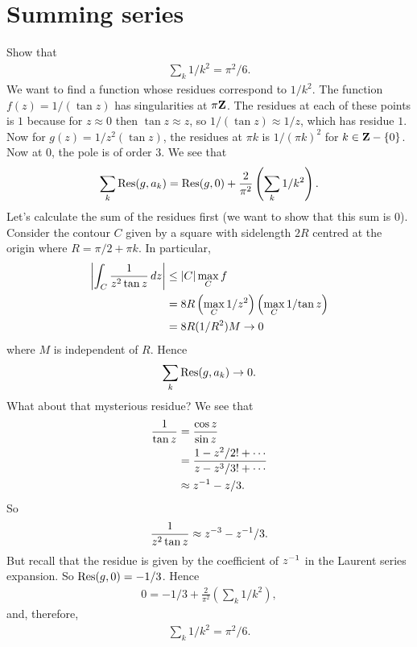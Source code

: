 \documentclass[11pt, oneside,margin=1in]{article}
\begin{document}
\section{Summing series}
\begin{example}\label{}\text{}
Show that
\begin{align*}
	\sum_k 1/k^2 = \pi^2/6.
\end{align*}
We want to find a function whose residues correspond to $1/k^2$. The function $f(z) = 1/ (\tan z)$ has singularities at $\pi \mathbf Z$. The residues at each of these points is $1$ because for $z\approx 0$ then $\tan z \approx z$, so $1/(\tan z)\approx 1/z$, which has residue $1$. Now for $g(z) = 1/z^2 (\tan z)$, the residues at $\pi k$ is $1/(\pi k)^2$ for $k \in \mathbf Z- \{0\}$. Now at $0$, the pole is of order $3$. We see that
\begin{align*}
	\sum_k \operatorname{Res}(g,a_k) = \operatorname{Res}(g,0) + \frac{2}{\pi^2} \left( \sum_k 1/k^2 \right).
\end{align*}
Let's calculate the sum of the residues first (we want to show that this sum is $0$). Consider the contour $C$ given by a square with sidelength $2R$ centred at the origin where $R = \pi/2 + \pi k$. In particular, 
 \begin{align*}
	 \left \lvert \int_C \frac{1}{z^2\tan z} \, dz \right \rvert &\le \left \lvert C \right \rvert \max_C f\\
						&= 8R\left (\max_C {1}/{z^2}\right) \left(\max_C {1}/{\tan z}\right)\\
						&= 8R(1/R^2)M \to 0
\end{align*}
where $M$ is independent of $R$. Hence
\begin{align*}
	\sum_{k} \operatorname{Res}(g,a_k) \to 0.
\end{align*}
What about that mysterious residue? We see that
\begin{align*}
	\frac{1}{\tan z} &= \frac{\cos z}{\sin z}\\ &= \frac{ 1 - z^2/2! + \cdots}{z - z^3/3! + \cdots}\\
			 &\approx z^{-1} - z/3.
\end{align*}
So 
\begin{align*}
	\frac{1}{z^2\tan z} \approx z^{-3} - z^{-1} / 3.
\end{align*}
But recall that the residue is given by the coefficient of $z^{-1}$ in the Laurent series expansion. So $\operatorname{Res} (g,0) = -1/3$. Hence
\begin{align*}
	0 = -1/3 + \frac{2}{\pi^2} \left(\sum_k 1/k^2\right),
\end{align*}
and, therefore,
\begin{align*}
	\sum_k 1/k^2 = \pi^2/6.
\end{align*}
\end{example}
\end{document}
